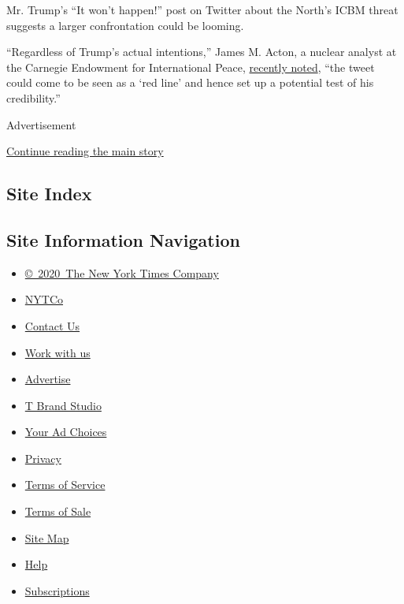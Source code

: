Mr. Trump's ``It won't happen!'' post on Twitter about the North's ICBM
threat suggests a larger confrontation could be looming.

``Regardless of Trump's actual intentions,'' James M. Acton, a nuclear
analyst at the Carnegie Endowment for International Peace,
\href{https://www.theatlantic.com/international/archive/2017/01/trump-twitter-north-korea/512450/}{recently
noted}, ``the tweet could come to be seen as a `red line' and hence set
up a potential test of his credibility.''

Advertisement

\protect\hyperlink{after-bottom}{Continue reading the main story}

\hypertarget{site-index}{%
\subsection{Site Index}\label{site-index}}

\hypertarget{site-information-navigation}{%
\subsection{Site Information
Navigation}\label{site-information-navigation}}

\begin{itemize}
\tightlist
\item
  \href{https://help.nytimes.com/hc/en-us/articles/115014792127-Copyright-notice}{©~2020~The
  New York Times Company}
\end{itemize}

\begin{itemize}
\tightlist
\item
  \href{https://www.nytco.com/}{NYTCo}
\item
  \href{https://help.nytimes.com/hc/en-us/articles/115015385887-Contact-Us}{Contact
  Us}
\item
  \href{https://www.nytco.com/careers/}{Work with us}
\item
  \href{https://nytmediakit.com/}{Advertise}
\item
  \href{http://www.tbrandstudio.com/}{T Brand Studio}
\item
  \href{https://www.nytimes.com/privacy/cookie-policy\#how-do-i-manage-trackers}{Your
  Ad Choices}
\item
  \href{https://www.nytimes.com/privacy}{Privacy}
\item
  \href{https://help.nytimes.com/hc/en-us/articles/115014893428-Terms-of-service}{Terms
  of Service}
\item
  \href{https://help.nytimes.com/hc/en-us/articles/115014893968-Terms-of-sale}{Terms
  of Sale}
\item
  \href{https://spiderbites.nytimes.com}{Site Map}
\item
  \href{https://help.nytimes.com/hc/en-us}{Help}
\item
  \href{https://www.nytimes.com/subscription?campaignId=37WXW}{Subscriptions}
\end{itemize}
